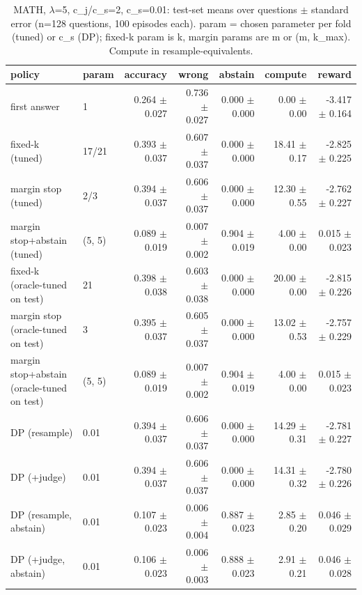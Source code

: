 \begin{table}[t]
\centering
\small
\caption{MATH, $\lambda$=5, c\_j/c\_s=2, c\_s=0.01: test-set means over questions $\pm$ standard error (n=128 questions, 100 episodes each). param = chosen parameter per fold (tuned) or c\_s (DP); fixed-k param is k, margin params are m or (m, k\_max). Compute in resample-equivalents.}
\label{tab:headline_math_lam5_jr2}
\begin{tabular}{llrrrrr}
\toprule
policy & param & accuracy & wrong & abstain & compute & reward \\
\midrule
first answer & 1 & 0.264 $\pm$ 0.027 & 0.736 $\pm$ 0.027 & 0.000 $\pm$ 0.000 & 0.00 $\pm$ 0.00 & -3.417 $\pm$ 0.164 \\
fixed-k (tuned) & 17/21 & 0.393 $\pm$ 0.037 & 0.607 $\pm$ 0.037 & 0.000 $\pm$ 0.000 & 18.41 $\pm$ 0.17 & -2.825 $\pm$ 0.225 \\
margin stop (tuned) & 2/3 & 0.394 $\pm$ 0.037 & 0.606 $\pm$ 0.037 & 0.000 $\pm$ 0.000 & 12.30 $\pm$ 0.55 & -2.762 $\pm$ 0.227 \\
margin stop+abstain (tuned) & (5, 5) & 0.089 $\pm$ 0.019 & 0.007 $\pm$ 0.002 & 0.904 $\pm$ 0.019 & 4.00 $\pm$ 0.00 & 0.015 $\pm$ 0.023 \\
fixed-k (oracle-tuned on test) & 21 & 0.398 $\pm$ 0.038 & 0.603 $\pm$ 0.038 & 0.000 $\pm$ 0.000 & 20.00 $\pm$ 0.00 & -2.815 $\pm$ 0.226 \\
margin stop (oracle-tuned on test) & 3 & 0.395 $\pm$ 0.037 & 0.605 $\pm$ 0.037 & 0.000 $\pm$ 0.000 & 13.02 $\pm$ 0.53 & -2.757 $\pm$ 0.229 \\
margin stop+abstain (oracle-tuned on test) & (5, 5) & 0.089 $\pm$ 0.019 & 0.007 $\pm$ 0.002 & 0.904 $\pm$ 0.019 & 4.00 $\pm$ 0.00 & 0.015 $\pm$ 0.023 \\
DP (resample) & 0.01 & 0.394 $\pm$ 0.037 & 0.606 $\pm$ 0.037 & 0.000 $\pm$ 0.000 & 14.29 $\pm$ 0.31 & -2.781 $\pm$ 0.227 \\
DP (+judge) & 0.01 & 0.394 $\pm$ 0.037 & 0.606 $\pm$ 0.037 & 0.000 $\pm$ 0.000 & 14.31 $\pm$ 0.32 & -2.780 $\pm$ 0.226 \\
DP (resample, abstain) & 0.01 & 0.107 $\pm$ 0.023 & 0.006 $\pm$ 0.004 & 0.887 $\pm$ 0.023 & 2.85 $\pm$ 0.20 & 0.046 $\pm$ 0.029 \\
DP (+judge, abstain) & 0.01 & 0.106 $\pm$ 0.023 & 0.006 $\pm$ 0.003 & 0.888 $\pm$ 0.023 & 2.91 $\pm$ 0.21 & 0.046 $\pm$ 0.028 \\
\bottomrule
\end{tabular}
\end{table}
